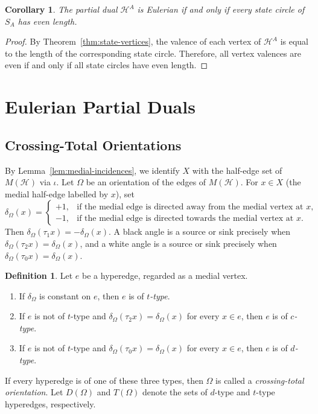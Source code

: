 \documentclass[10pt,a4paper]{article}
\newtheorem{corollary}[theorem]{Corollary}
\theoremstyle{definition}
\newtheorem{definition}[theorem]{Definition}
\theoremstyle{remark}
\newcommand{\Hcal}{\mathcal{H}}
\begin{document}
\begin{corollary}\label{cor:even-state}
The partial dual $\Hcal^A$ is Eulerian if and only if every state circle of
$S_A$ has even length.
\end{corollary}

\begin{proof}
By Theorem~\ref{thm:state-vertices}, the valence of each vertex of
$\Hcal^A$ is equal to the length of the corresponding state circle.
Therefore, all vertex valences are even if and only if all state circles have
even length.
\end{proof}

\section{Eulerian Partial Duals}

\subsection{Crossing-Total Orientations}

By Lemma~\ref{lem:medial-incidences}, we identify $X$ with the half-edge set of $M(\Hcal)$ via $\iota$. Let $\Omega$ be an orientation of the edges of $M(\Hcal)$. For $x\in X$ (the medial half-edge labelled by $x$), set
\[
 \delta_\Omega(x)=
 \begin{cases}
  +1,&\text{if the medial edge is directed away from the medial vertex at }x,\\
  -1,&\text{if the medial edge is directed towards the medial vertex at }x.
 \end{cases}
\]
Then $\delta_\Omega(\tau_1x)=-\delta_\Omega(x)$. A black angle is a source or sink precisely when $\delta_\Omega(\tau_2x)=\delta_\Omega(x)$, and a white angle is a source or sink precisely when $\delta_\Omega(\tau_0x)=\delta_\Omega(x)$.

\begin{definition}\label{def:crossing-total}
Let $e$ be a hyperedge, regarded as a medial vertex.
\begin{enumerate}[label=\textup{(\alph*)}]
\item If $\delta_\Omega$ is constant on $e$, then $e$ is of \emph{$t$-type}.
\item If $e$ is not of $t$-type and $\delta_\Omega(\tau_2x)=\delta_\Omega(x)$ for every $x\in e$, then $e$ is of \emph{$c$-type}.
\item If $e$ is not of $t$-type and $\delta_\Omega(\tau_0x)=\delta_\Omega(x)$ for every $x\in e$, then $e$ is of \emph{$d$-type}.
\end{enumerate}
If every hyperedge is of one of these three types, then $\Omega$ is called a \emph{crossing-total orientation}. Let $D(\Omega)$ and $T(\Omega)$ denote the sets of $d$-type and $t$-type hyperedges, respectively.
\end{definition}
\end{document}
